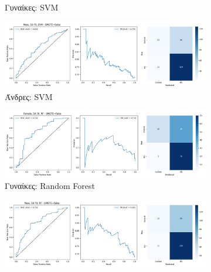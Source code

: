 \documentclass[12pt]{report}
\begin{document}
\begin{figure}[H]
\begin{subfigure}[b]{0.48\textwidth}
                        \caption{Γυναίκες: SVM}
                        \label{fig:results_stratified_Female_50-70_SVM_useSMOTE_False}
                    \end{subfigure}
                    \hfill
                    \begin{subfigure}[b]{0.48\textwidth}
                        \includegraphics[width=\textwidth]{ML/Predict/DEG/AUC/results_stratified_Male_50-70_SVM_useSMOTE_False.png}
                        \caption{Άνδρες: SVM}
                        \label{fig:results_stratified_Male_50-70_SVM_useSMOTE_False}
                    \end{subfigure}
                    \vspace{0.5cm}
                    \begin{subfigure}[b]{0.48\textwidth}
                        \includegraphics[width=\textwidth]{ML/Predict/DEG/AUC/results_stratified_Female_50-70_RF_useSMOTE_False.png}
                        \caption{Γυναίκες: Random Forest}
                        \label{fig:results_stratified_Female_50-70_RF_useSMOTE_False}
                    \end{subfigure}
                    \hfill
                    \begin{subfigure}[b]{0.48\textwidth}
                        \includegraphics[width=\textwidth]{ML/Predict/DEG/AUC/results_stratified_Male_50-70_RF_useSMOTE_False.png}

\end{subfigure}
\end{figure}
\end{document}
